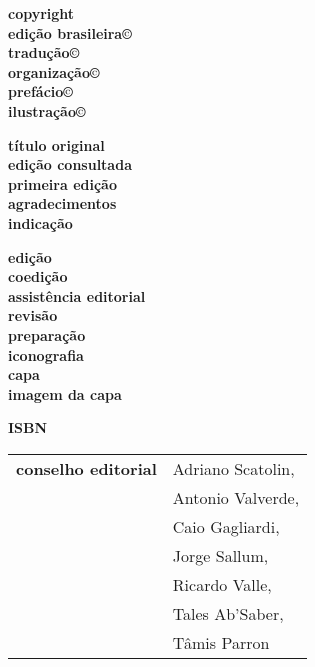 \newcommand{\linha}[2]{\ifdef{#2}{\linhalayout{#1}{#2}}{}}

\begingroup\tiny
\parindent=0cm
\thispagestyle{empty}

\textbf{copyright}\\
\textbf{edição brasileira©}\\
\textbf{tradução©}\\
\textbf{organização©}\\
\textbf{prefácio©}\\
\textbf{ilustração©}\medskip

\textbf{título original}\\
\textbf{edição consultada}\\
\textbf{primeira edição}\\
\textbf{agradecimentos}\\
\textbf{indicação}\medskip

\textbf{edição}\\
\textbf{coedição}\\
\textbf{assistência editorial}\\
\textbf{revisão}\\
\textbf{preparação}\\
\textbf{iconografia}\\
\textbf{capa}\\
\textbf{imagem da capa}\medskip

\textbf{ISBN}\smallskip

\hspace{-5pt}\begin{tabular}{ll}
\textbf{conselho editorial} & Adriano Scatolin,  \\
							& Antonio Valverde,  \\
							& Caio Gagliardi,    \\
							& Jorge Sallum,      \\
							& Ricardo Valle,     \\
							& Tales Ab'Saber,    \\
							& Tâmis Parron      
\end{tabular}
 

